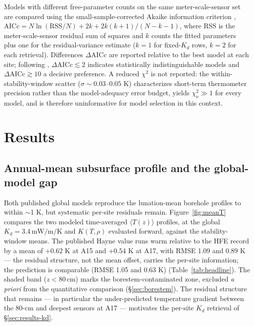 \documentclass[11pt]{article}
\newcommand{\zborestem}{80\,\si{\centi\meter}}
\begin{document}
Models with different free-parameter counts on the same
meter-scale-sensor set are compared using the
small-sample-corrected Akaike information criterion \citep{burnham2002},
$\mathrm{AICc}=N\ln(\mathrm{RSS}/N)+2k+2k(k{+}1)/(N{-}k{-}1)$, where RSS is
the meter-scale-sensor residual sum of squares and
$k$ counts the fitted parameters plus one for the residual-variance
estimate ($k=1$ for fixed-$K_d$ rows, $k=2$ for each retrieval). Differences $\Delta\mathrm{AICc}$ are reported relative
to the best model at each site; following \citet{burnham2002},
$\Delta\mathrm{AICc}\lesssim 2$ indicates statistically indistinguishable
models and $\Delta\mathrm{AICc}\gtrsim 10$ a decisive preference. A reduced
$\chi^2$ is not reported: the within-stability-window scatter
($\sigma\sim 0.03$--$0.05$ K) characterizes short-term thermometer
precision rather than the model-adequacy error budget, yields
$\chi^2_\nu\gg 1$ for every model, and is therefore uninformative for model
selection in this context.

\section{Results}\label{sec:results}

\subsection{Annual-mean subsurface profile and the global-model gap}%
\label{sec:results-mean}
Both published global models
reproduce the lunation-mean borehole profiles to within $\sim$1 K, but
systematic per-site residuals remain. Figure~\ref{fig:meanT} compares
the two modeled time-averaged $\langle T(z)\rangle$ profiles,
\citet{hayne2017} at the global
$K_d=3.4\,\si{\milli\watt\per\meter\per\kelvin}$ and
\citet{martinez2021} $K(T,\rho)$ evaluated forward, against the
stability-window means. The published Hayne value runs warm relative to the
HFE record by a mean of $+0.62$ K at A15 and $+0.54$ K at A17, with RMSE 1.09 and
0.89 K --- the residual structure, not the mean offset, carries the
per-site information; the \citet{martinez2021} prediction
is
comparable (RMSE 1.05 and 0.63 K) (Table~\ref{tab:headline}). The
shaded band ($z<\zborestem$) marks the borestem-contaminated zone,
excluded \emph{a priori} from the quantitative comparison
(\S\ref{sec:borestem}). The residual structure that remains --- in particular the
under-predicted temperature gradient between the 80-cm and deepest
sensors at A17 --- motivates the per-site $K_d$ retrieval of
\S\ref{sec:results-kd}.
\end{document}
